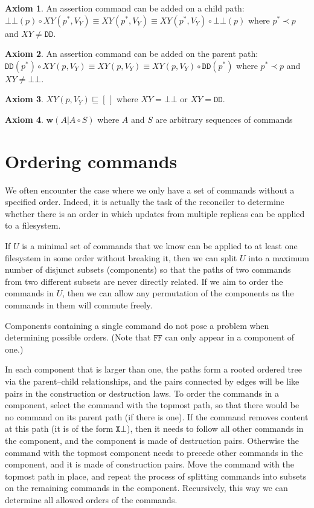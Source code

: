 \documentclass[12pt]{article}
\newcommand{\empt}{\bot}
\newcommand{\pp}{p^*} %
\newcommand{\fscommand}[2]{{#1#2}}
\newcommand{\fsregcommandchar}[1]{\mathtt{#1}}
\newcommand{\fsregcommand}[2]{\fscommand{\fsregcommandchar{#1}}{\fsregcommandchar{#2}}}
\newcommand{\cbb}{\fsregcommand{\empt}{\empt}}
\newcommand{\cff}{\fsregcommand{F}{F}}
\newcommand{\cdd}{\fsregcommand{D}{D}}
\newcommand{\cxy}{\fscommand{X}{Y}}
\newcommand{\cc}{\circ} %
\newcommand{\descendant}{\prec}
\newcommand{\eqext}{\sqsubseteq}
\newcommand{\worksc}[2]{{\mathbf{w}}({#1}|{#2})}
\newcommand{\emptyseq}{[\,]} %
\theoremstyle{definition}
\newtheorem{myax}{Axiom}
\begin{document}
\begin{myax}\label{ax_child_assert}
An assertion command can be added on a child path:
$\cbb(p)\cc \cxy(\pp,V_Y) \equiv \cxy(\pp,V_Y) \equiv \cxy(\pp,V_Y)\cc \cbb(p)$ where $\pp\descendant p$ and $\cxy\neq\cdd$.
\end{myax}

\begin{myax}\label{ax_parent_assert}
An assertion command can be added on the parent path:
$\cdd(\pp)\cc \cxy(p,V_Y) \equiv \cxy(p,V_Y) \equiv \cxy(p,V_Y)\cc \cdd(\pp)$ where $\pp\descendant p$ and $\cxy\neq\cbb$.
\end{myax}

\begin{myax}\label{ax_assert}
$\cxy(p,V_Y) \eqext \emptyseq$ where $\cxy=\cbb$ or $\cxy=\cdd$.
\end{myax}

\begin{myax}\label{worksextpostfix}
$\worksc{A}{A\cc S}$ where $A$ and $S$ are arbitrary sequences of commands
\end{myax}

\section{Ordering commands}

We often encounter the case where we only have a set of commands without a specified order.
Indeed, it is actually the task of the reconciler to determine whether there is an order
in which updates from multiple replicas can be applied to a filesystem.

If $U$ is a minimal set of commands
that we know can be applied to at least one filesystem in some order without breaking it,
then we can split $U$ into a maximum number of disjunct subsets
(components) so that the paths of two commands from two different subsets are never directly related.
If we aim to order the commands in $U$, then we can allow any permutation of 
the components as the commands in them will commute freely.

Components containing a single command do not pose a problem when determining
possible orders.
(Note that $\cff$ can only appear in a component of one.)

In each component that is larger than one, the paths 
form a rooted ordered tree via the parent--child relationships,
and the pairs connected by edges will be like pairs in the
construction or destruction laws.
To order the commands in a component,
select the command with the topmost path, so that there would be no command
on its parent path (if there is one). 
If the command removes content at this path (it is of the form $\fsregcommand{X}{\empt}$), then it
needs to follow all other commands in the component, and
the component is made of destruction pairs.
Otherwise the command with the topmost component needs to precede other commands
in the component, and it is made of construction pairs.
Move the command with the topmost path in place, and
repeat the process of splitting commands into subsets on the remaining commands
in the component. Recursively, this way we can determine all allowed orders of the commands.
\end{document}
